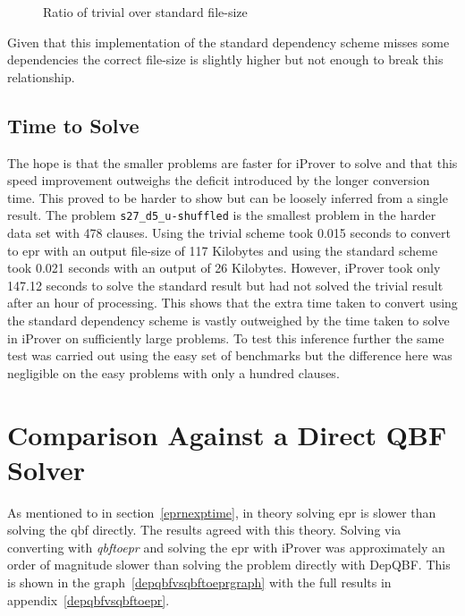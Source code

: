\begin{figure}[h]
\caption{Ratio of trivial over standard file-size}
\label{trivialsizeoverstandardsize}
\begin{CenteredBox}

\end{CenteredBox}
\end{figure}

Given that this implementation of the standard dependency scheme misses some dependencies the correct file-size is slightly higher but not enough to break this relationship.

\subsection{Time to Solve} \label{tvsstdsolve}
The hope is that the smaller problems are faster for iProver to solve and that this speed improvement outweighs the deficit introduced by the longer conversion time. This proved to be harder to show but can be loosely inferred from a single result. The problem \texttt{s27\_d5\_u-shuffled} is the smallest problem in the harder data set with 478 clauses. Using the trivial scheme took 0.015 seconds to convert to \gls{epr} with an output file-size of 117 Kilobytes and using the standard scheme took 0.021 seconds with an output of 26 Kilobytes. However, iProver took only 147.12 seconds to solve the standard result but had not solved the trivial result after an hour of processing. This shows that the extra time taken to convert using the standard dependency scheme is vastly outweighed by the time taken to solve in iProver on sufficiently large problems. To test this inference further the same test was carried out using the easy set of benchmarks but the difference here was negligible on the easy problems with only a hundred clauses.

\section{Comparison Against a Direct QBF Solver}
As mentioned to in section~\ref{eprnexptime}, in theory solving \gls{epr} is slower than solving the \gls{qbf} directly. The results agreed with this theory. Solving via converting with \textit{qbftoepr} and solving the \gls{epr} with iProver was approximately an order of magnitude slower than solving the problem directly with DepQBF. This is shown in the graph~\ref{depqbfvsqbftoeprgraph} with the full results in appendix~\ref{depqbfvsqbftoepr}.

